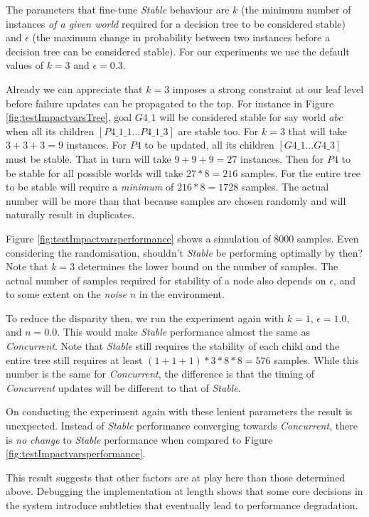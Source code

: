 \documentclass[a4paper]{article}
\newcommand{\cc}{\emph{Concurrent}\xspace}
\newcommand{\st}{\emph{Stable}\xspace}
\newcommand{\dt}{{decision tree}\xspace}
\begin{document}
The parameters that fine-tune \st behaviour are $k$ (the minimum number of instances \emph{of a given world} required for a \dt to be considered stable) and $\epsilon $ (the maximum change in probability between two instances before a \dt can be considered stable). For our experiments we use the default values of $k=3$ and $\epsilon=0.3$.

Already we can appreciate that $k=3$ imposes a strong constraint at our leaf level before failure updates can be propagated to the top. For instance in Figure \ref{fig:testImpactvarsTree}, goal $G4\_1$ will be considered stable for say world $abc$ when all its children $[P4\_1\_1 \ldots P4\_1\_3]$ are stable too. For $k=3$ that will take $3+3+3=9$ instances. For $P4$ to be updated, all its children $[G4\_1 \ldots G4\_3]$ must be stable. That in turn will take $9+9+9=27$ instances. Then for $P4$ to be stable for all possible worlds will take $27*8=216$ samples. For the entire tree to be stable will require a \emph{minimum} of $216*8=1728$ samples. The actual number will be more than that because samples are chosen randomly and will naturally result in duplicates.

Figure \ref{fig:testImpactvarsperformance} shows a simulation of $8000$ samples. Even considering the randomisation, shouldn't \st be performing optimally by then? Note that $k=3$ determines the lower bound on the number of samples. The actual number of samples required for stability of a node also depends on $\epsilon$, and to some extent on the \emph{noise} $n$ in the environment.

To reduce the disparity then, we run the experiment again with $k=1$, $\epsilon=1.0$, and $n=0.0$. This would make \st performance almost the same as \cc. Note that \st still requires the stability of each child and the entire tree still requires at least $(1+1+1)*3*8*8=576$ samples. While this number is the same for \cc, the difference is that the timing of \cc updates will be different to that of \st.

On conducting the experiment again with these lenient parameters the result is unexpected. Instead of \st performance converging towards \cc, there is \emph{no change} to \st performance when compared to Figure \ref{fig:testImpactvarsperformance}. 

This result suggests that other factors are at play here than those determined above. Debugging the implementation at length shows that some core decisions in the system introduce subtleties that eventually lead to performance degradation.
\end{document}
